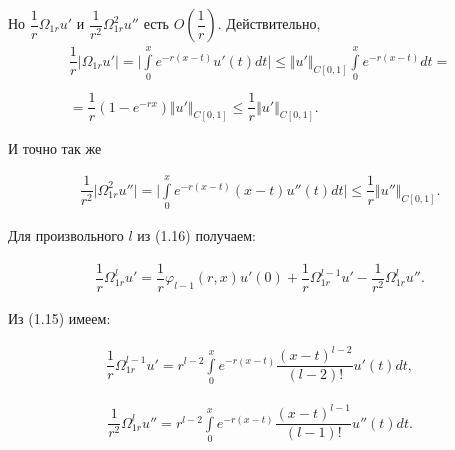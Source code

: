 Но $ \dfrac{1}{r}\Omega_{1r}u' $ и $ \dfrac{1}{r^2}\Omega_{1r}^2u'' $ есть $ O(\dfrac{1}{r}) $. Действительно,
\begin{equation}
\begin{array}{c}
\nonumber

\dfrac{1}{r}\vert\Omega_{1r}u'\vert = \biggl\vert \int\limits_0^x e^{-r(x-t)}u'(t)dt \biggr\vert \leq \Vert u' \Vert_{C[0,1]} \int\limits_0^x e^{-r(x-t)}dt = \\\\
= \dfrac{1}{r}(1 - e^{-rx})\Vert u' \Vert_{C[0,1]} \leq \dfrac{1}{r} \Vert u' \Vert_{C[0,1]}.

\end{array}
\end{equation}

И точно так же

\begin{equation}
\begin{array}{c}
\nonumber

\dfrac{1}{r^2} \biggl\vert \Omega_{1r}^2u'' \biggr\vert = \biggl\vert \int\limits_0^x e^{-r(x-t)}(x-t)u''(t)dt \biggr\vert \leq \dfrac{1}{r} \Vert u'' \Vert_{C[0,1]}.

\end{array}
\end{equation}

Для произвольного $ l $ из (1.16) получаем:

\begin{equation}
\begin{array}{c}

\dfrac{1}{r} \Omega_{1r}^lu' = \dfrac{1}{r} \varphi_{l-1}(r,x)u'(0) + \dfrac{1}{r}\Omega_{1r}^{l-1}u' - \dfrac{1}{r^2} \Omega_{1r}^lu''.

\end{array}
\end{equation}

Из (1.15) имеем:

\begin{equation}
\begin{array}{c}

\dfrac{1}{r}\Omega_{1r}^{l-1}u' = r^{l-2}\int\limits_0^x e^{-r(x-t)}\dfrac{(x-t)^{l-2}}{(l-2)!}u'(t)dt,

\end{array}
\end{equation}

\begin{equation}
\begin{array}{c}

\dfrac{1}{r^2} \Omega_{1r}^lu'' = r^{l-2}\int\limits_0^x e^{-r(x-t)}\dfrac{(x-t)^{l-1}}{(l-1)!}u''(t)dt.

\end{array}
\end{equation}

